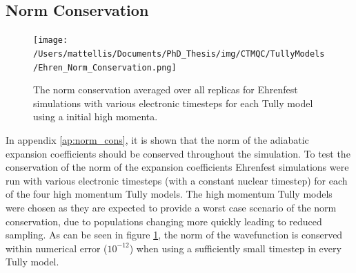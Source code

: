 \subsection{Norm Conservation}
\label{sect:normConsEhren}
\begin{figure}[ht]
	\texttt{[image: /Users/mattellis/Documents/PhD\_Thesis/img/CTMQC/TullyModels/Ehren\_Norm\_Conservation.png]}
	\caption{\label{fig:EhrenNormCons}The norm conservation averaged over all replicas for Ehrenfest simulations with various electronic timesteps for each Tully model using a initial high momenta.}
\end{figure}
\noindent In appendix \ref{ap:norm_cons}, it is shown that the norm of the adiabatic expansion coefficients should be conserved throughout the simulation. To test the conservation of the norm of the expansion coefficients Ehrenfest simulations were run with various electronic timesteps (with a constant nuclear timestep) for each of the four high momentum Tully models. The high momentum Tully models were chosen as they are expected to provide a worst case scenario of the norm conservation, due to populations changing more quickly leading to reduced sampling. As can be seen in figure \ref{fig:EhrenNormCons}, the norm of the wavefunction is conserved within numerical error ($10^{-12}$) when     using a sufficiently small timestep in every Tully model.

